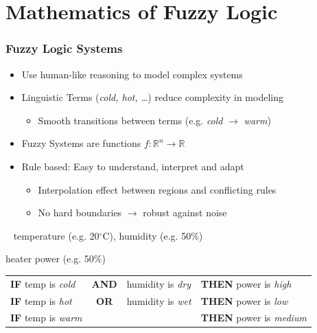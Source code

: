 \documentclass[
	10pt,
	t		%
]{beamer}
\begin{document}
\section{Mathematics of Fuzzy Logic}
\begin{frame}
	\frametitle{Fuzzy Logic Systems}

	\begin{itemize}
		\item Use human-like reasoning to model complex systems
		\item Linguistic Terms (\textit{cold, hot, \dots}) reduce complexity in modeling
		      \begin{itemize}
			      \item Smooth transitions between terms (e.g. \textit{cold} $\rightarrow$ \textit{warm})
		      \end{itemize}
		\item Fuzzy Systems are functions $f: \mathbb{R}^n \rightarrow \mathbb{R}$
		\item Rule based: Easy to understand, interpret and adapt
		      \begin{itemize}
			      \item Interpolation effect between regions and conflicting rules
			      \item No hard boundaries $\rightarrow$ robust against noise
		      \end{itemize}
	\end{itemize}

	\begin{example}[Heater Control]

		\begin{description}[wide=0]
			\item[\textbf{Input:}  ] ~ temperature (e.g. 20$^{\circ}$C), humidity (e.g. 50\%)
			\item[\textbf{Output:}] heater power (e.g. 50\%)
			\item[\textbf{Rules:}]
			      {\footnotesize
			      \begin{tabular}{lcll}
				      \textbf{IF}  temp is \textit{cold} & \textbf{AND} & humidity is \textit{dry} & \textbf{THEN}  power is \textit{high}   \\
				      \textbf{IF}  temp is \textit{hot}  & \textbf{OR}  & humidity is \textit{wet} & \textbf{THEN}  power is \textit{low}    \\
				      \textbf{IF}  temp is \textit{warm} &              &                          & \textbf{THEN}  power is \textit{medium} \\
			      \end{tabular} }
		\end{description}
	\end{example}

\end{frame}
\end{document}
